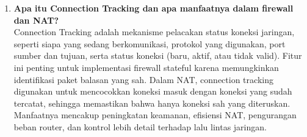 \begin{enumerate}
	\item \textbf{Apa itu Connection Tracking dan apa manfaatnya dalam firewall dan NAT?} \\
	Connection Tracking adalah mekanisme pelacakan status koneksi jaringan, seperti siapa yang sedang berkomunikasi, protokol yang digunakan, port sumber dan tujuan, serta status koneksi (baru, aktif, atau tidak valid). Fitur ini penting untuk implementasi firewall stateful karena memungkinkan identifikasi paket balasan yang sah. Dalam NAT, connection tracking digunakan untuk mencocokkan koneksi masuk dengan koneksi yang sudah tercatat, sehingga memastikan bahwa hanya koneksi sah yang diteruskan. Manfaatnya mencakup peningkatan keamanan, efisiensi NAT, pengurangan beban router, dan kontrol lebih detail terhadap lalu lintas jaringan.
\end{enumerate}
